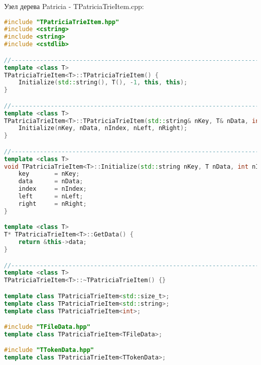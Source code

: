 Узел дерева Patricia - TPatriciaTrieItem.cpp:
\begin{lstlisting}[language=C++]
#include "TPatriciaTrieItem.hpp"
#include <cstring>
#include <string>
#include <cstdlib>

//----------------------------------------------------------------------------
template <class T>
TPatriciaTrieItem<T>::TPatriciaTrieItem() {
    Initialize(std::string(), T(), -1, this, this);
}

//----------------------------------------------------------------------------
template <class T>
TPatriciaTrieItem<T>::TPatriciaTrieItem(std::string& nKey, T& nData, int nIndex, TPatriciaTrieItem<T>* nLeft, TPatriciaTrieItem<T>* nRight) {
    Initialize(nKey, nData, nIndex, nLeft, nRight);
}

//----------------------------------------------------------------------------
template <class T>
void TPatriciaTrieItem<T>::Initialize(std::string nKey, T nData, int nIndex, TPatriciaTrieItem<T>* nLeft, TPatriciaTrieItem<T>* nRight) {
    key       = nKey;
    data      = nData;
    index     = nIndex;
    left      = nLeft;
    right     = nRight;
}

template <class T>
T* TPatriciaTrieItem<T>::GetData() {
    return &this->data;
}

//----------------------------------------------------------------------------
template <class T>
TPatriciaTrieItem<T>::~TPatriciaTrieItem() {}

template class TPatriciaTrieItem<std::size_t>;
template class TPatriciaTrieItem<std::string>;
template class TPatriciaTrieItem<int>;

#include "TFileData.hpp"
template class TPatriciaTrieItem<TFileData>;

#include "TTokenData.hpp"
template class TPatriciaTrieItem<TTokenData>;
\end{lstlisting}

\pagebreak


